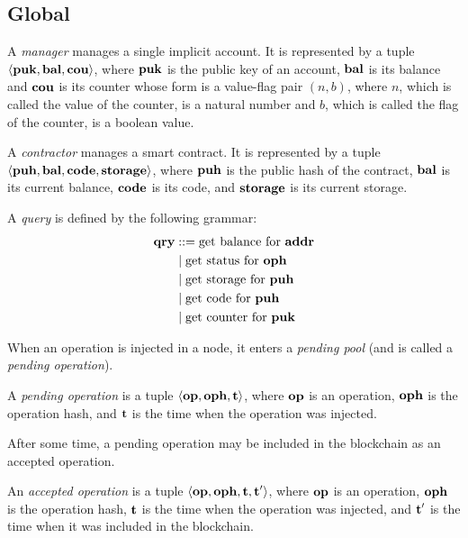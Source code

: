 \documentclass[a4paper]{llncs}
\begin{document}
\subsection{Global}
\label{sec:global}



\begin{definition}%
A \emph{manager} manages a single implicit account. It is represented by a
tuple $\langle  \textbf{puk}, \textbf{bal}, \textbf{cou} \rangle $, where  $\textbf{puk}$ is the
public key of an account, $\textbf{bal}$ is its
balance and $\textbf{cou}$ is its counter whose form is a value-flag pair $(n, b)$, where $n$, which is called the value of the counter,  is a natural number and ${b}$, which is called the flag of the counter, is a boolean value.  
\end{definition}

\begin{definition}%
  A \emph{contractor} manages a smart contract. It is
  represented by a tuple
  $\langle \textbf{puh}, \textbf{bal}, \textbf{code}, \textbf{storage} \rangle $, where $\textbf{puh}$ is the
  public hash of the contract, $\textbf{bal}$ is its current balance, $\textbf{code}$ is its
  code, and $\textbf{storage}$ is its current storage.
\end{definition}


\begin{definition}%
A \emph{query} is defined by the following grammar:
\begin{align*}
  \textbf{qry} & ::= \text{get balance for $\textbf{addr}$}
  \\&\mid \text{get status for $\textbf{oph}$}
  \\&\mid \text{get storage for $\textbf{puh}$}
  \\&\mid \text{get code for $\textbf{puh}$} 
  \\&\mid \text{get counter for $\textbf{puk}$}
\end{align*}

\end{definition}

When an operation is injected in a node, it enters a \emph{pending pool}
(and is called a \emph{pending operation}). 
 \begin{definition}%
A \emph{pending operation} is a tuple  $\langle  \textbf{op}, \textbf{oph}, \textbf{t}
\rangle $, where $\textbf{op}$ is an operation, $\textbf{oph}$ is the operation hash,
and $\textbf{t}$ is the time when the operation was injected. 
\end{definition}
After some time, a pending operation may be included in the blockchain as an accepted operation.
 \begin{definition}%
An \emph{accepted operation}  is a tuple $\langle  \textbf{op}, \textbf{oph}, \textbf{t}, \textbf{t}' \rangle
$, where $\textbf{op}$ is an operation, $\textbf{oph}$ is the operation hash, $\textbf{t}$ is the time when the operation was injected, and
$\textbf{t}'$ is the time when it was included in the blockchain. 
\end{definition}
\end{document}
